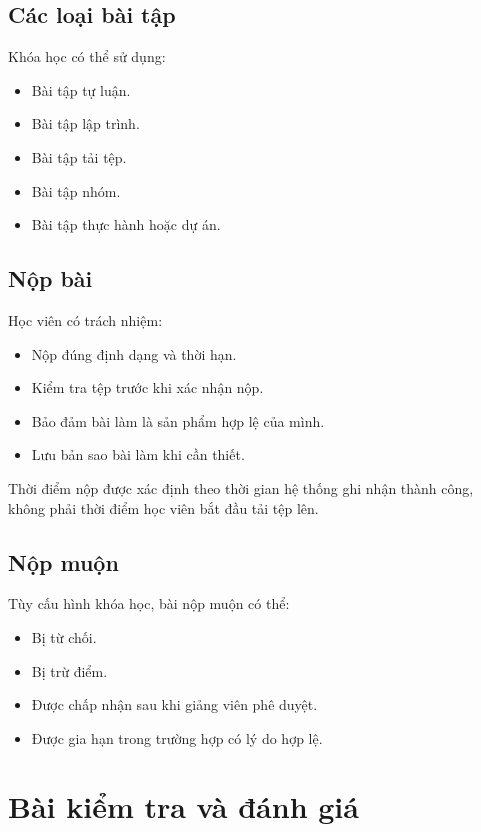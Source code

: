 \documentclass[12pt,a4paper]{article}
\begin{document}
\subsection{Các loại bài tập}

Khóa học có thể sử dụng:

\begin{itemize}
    \item Bài tập tự luận.
    \item Bài tập lập trình.
    \item Bài tập tải tệp.
    \item Bài tập nhóm.
    \item Bài tập thực hành hoặc dự án.
\end{itemize}

\subsection{Nộp bài}

Học viên có trách nhiệm:

\begin{itemize}
    \item Nộp đúng định dạng và thời hạn.
    \item Kiểm tra tệp trước khi xác nhận nộp.
    \item Bảo đảm bài làm là sản phẩm hợp lệ của mình.
    \item Lưu bản sao bài làm khi cần thiết.
\end{itemize}

Thời điểm nộp được xác định theo thời gian hệ thống ghi nhận thành công,
không phải thời điểm học viên bắt đầu tải tệp lên.

\subsection{Nộp muộn}

Tùy cấu hình khóa học, bài nộp muộn có thể:

\begin{itemize}
    \item Bị từ chối.
    \item Bị trừ điểm.
    \item Được chấp nhận sau khi giảng viên phê duyệt.
    \item Được gia hạn trong trường hợp có lý do hợp lệ.
\end{itemize}

\section{Bài kiểm tra và đánh giá}
\end{document}
